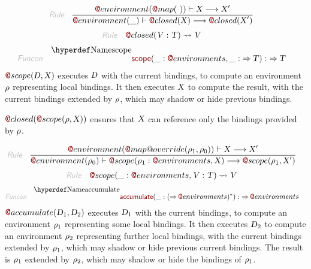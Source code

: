 \begin{align*}
  \KEY{Rule} \quad
    & \RULE{
        \FUN@environment (  \FUN@map
                        (   \  ) ) \vdash \VAR{X} \TRANS 
          \VAR{X}'
      }{
        \FUN@environment (  \_ ) \vdash \FUN@closed
                      (  \VAR{X} ) \TRANS 
          \FUN@closed
            (  \VAR{X}' )
      }
\end{align*}
\begin{align*}
  \KEY{Rule} \quad
    & \FUN@closed
        (  \VAR{V} : \VAR{T} ) \leadsto 
        \VAR{V}
\end{align*}
\begin{align*}
  \KEY{Funcon} \quad
  & \FUNDEC{scope}(
                     \_ : \FUN@environments, \_ :  \TO \VAR{T}) 
    :  \TO \VAR{T} 
\end{align*}
$\FUN@scope
    (  \VAR{D}, 
           \VAR{X} )$ executes $\VAR{D}$ with the current bindings, to compute an environment
  $\VAR{\ensuremath{\rho}}$ representing local bindings. It then executes $\VAR{X}$ to compute the result,
  with the current bindings extended by $\VAR{\ensuremath{\rho}}$, which may shadow or hide previous
  bindings.

$\FUN@closed
    (  \FUN@scope
            (  \VAR{\ensuremath{\rho}}, 
                   \VAR{X} ) )$ ensures that $\VAR{X}$ can reference only the bindings
  provided by $\VAR{\ensuremath{\rho}}$.

\begin{align*}
  \KEY{Rule} \quad
    & \RULE{
        \FUN@environment (  \FUN@map@override
                        (  \VAR{\ensuremath{\rho}}\SUB{1}, 
                               \VAR{\ensuremath{\rho}}\SUB{0} ) ) \vdash \VAR{X} \TRANS 
          \VAR{X}'
      }{
        \FUN@environment (  \VAR{\ensuremath{\rho}}\SUB{0} ) \vdash \FUN@scope
                      (  \VAR{\ensuremath{\rho}}\SUB{1} : \FUN@environments, 
                             \VAR{X} ) \TRANS 
          \FUN@scope
            (  \VAR{\ensuremath{\rho}}\SUB{1}, 
                   \VAR{X}' )
      }
\end{align*}
\begin{align*}
  \KEY{Rule} \quad
    & \FUN@scope
        (  \_ : \FUN@environments, 
               \VAR{V} : \VAR{T} ) \leadsto 
        \VAR{V}
\end{align*}
\begin{align*}
  \KEY{Funcon} \quad
  & \FUNDEC{accumulate}(
                     \_ : (   \TO \FUN@environments )\STAR) 
    :  \TO \FUN@environments 
\end{align*}
$\FUN@accumulate
    (  \VAR{D}\SUB{1}, 
           \VAR{D}\SUB{2} )$ executes $\VAR{D}\SUB{1}$ with the current bindings, to compute an
  environment $\VAR{\ensuremath{\rho}}\SUB{1}$ representing some local bindings. It then executes $\VAR{D}\SUB{2}$ to
  compute an environment $\VAR{\ensuremath{\rho}}\SUB{2}$ representing further local bindings, with the
  current bindings extended by $\VAR{\ensuremath{\rho}}\SUB{1}$, which may shadow or hide previous
  current bindings. The result is $\VAR{\ensuremath{\rho}}\SUB{1}$ extended by $\VAR{\ensuremath{\rho}}\SUB{2}$, which may shadow
  or hide the bindings of $\VAR{\ensuremath{\rho}}\SUB{1}$.

